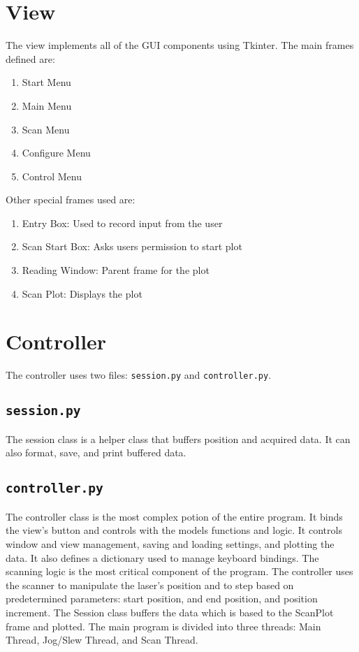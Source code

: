 \documentclass[11pt]{article}
\begin{document}
\section{View}
The view implements all of the GUI components using Tkinter. The main frames defined are:
\begin{enumerate}
    \item Start Menu
    \item Main Menu
    \item Scan Menu
    \item Configure Menu
    \item Control Menu
\end{enumerate}
Other special frames used are:
\begin{enumerate}
    \item Entry Box: Used to record input from the user 
    \item Scan Start Box: Asks users permission to start plot 
    \item Reading Window: Parent frame for the plot 
    \item Scan Plot: Displays the plot  
\end{enumerate}
\section{Controller}
The controller uses two files: \texttt{session.py} and \texttt{controller.py}.
\subsection{\texttt{session.py}}
The session class is a helper class that buffers position and acquired data. It can also format, save, and print buffered data.
\subsection{\texttt{controller.py}}
The controller class is the most complex potion of the entire program. It binds the view's button and controls with the models functions and logic. It  controls window and view management, saving and loading settings, and plotting the data. It also defines a dictionary used to manage keyboard bindings. 
The scanning logic is the most critical component of the program. The controller uses the scanner to manipulate the laser's position and to step  based on predetermined parameters: start position, and end position, and position increment. The Session class buffers the data which is based to the ScanPlot frame and plotted. The main program  is divided into three threads: Main Thread, Jog/Slew Thread, and Scan Thread.
\end{document}
